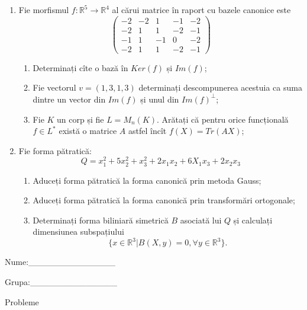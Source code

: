\documentclass{article}
\begin{document}
\begin{enumerate}
 \item Fie morfismul $f:\mathbb{R}^5 \to \mathbb{R}^4$ al cărui matrice în raport cu bazele canonice este
$$\begin{pmatrix}
-2&-2&1&-1&-2\\
-2&1&1&-2&-1\\
-1&1&-1&0&-2\\
-2&1&1&-2&-1
\end{pmatrix}$$

\begin{enumerate}
\item Determinați cîte o bază în $Ker(f)$ și $Im(f)$;
\item Fie vectorul $v=(1,3,1,3)$ determinați descompunerea acestuia ca suma dintre un vector din $Im(f)$ și unul din $Im(f)^\perp$;
\item Fie $K$ un corp și fie $L=M_n(K)$. Arătați că pentru orice funcțională $f \in L^*$ există o matrice $A$ astfel încît $f(X)=Tr(AX)$;
\end{enumerate}
\item Fie forma pătratică:
$$Q= x_1^2+5x_2^2+x_3^2+2x_1x_2+6X_1x_3+2x_2x_3$$

\begin{enumerate}
\item Aduceți forma pătratică la forma canonică prin metoda Gauss;
\item Aduceți forma pătratică la forma canonică prin transformări ortogonale;
\item Determinați forma biliniară simetrică $B$ asociată lui $Q$ și calculați dimensiunea subspațiului
$$\{x \in \mathbb{R}^3 | B(X,y)=0,\forall y \in \mathbb{R}^3\}.$$

\end{enumerate}
\end{enumerate}
\newpage
\begin{flushright}
Nume:\_\_\_\_\_\_\_\_\_\_\_\_\_\_
 
 
Grupa:\_\_\_\_\_\_\_\_\_\_\_\_\_\_
\end{flushright}
\begin{center}
\vspace{2cm}
{\Large Probleme}
\vspace{2cm}
\end{center}
\end{document}
